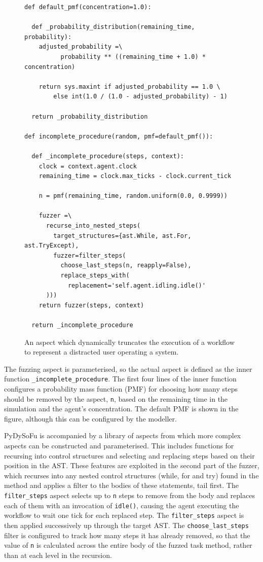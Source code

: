 \documentclass{llncs}
\begin{document}
\begin{figure}[t]
  \centering
\begin{lstlisting}
def default_pmf(concentration=1.0):

  def _probability_distribution(remaining_time, probability):
    adjusted_probability =\
          probability ** ((remaining_time + 1.0) * concentration)

    return sys.maxint if adjusted_probability == 1.0 \
        else int(1.0 / (1.0 - adjusted_probability) - 1)

  return _probability_distribution

def incomplete_procedure(random, pmf=default_pmf()):

  def _incomplete_procedure(steps, context):
    clock = context.agent.clock
    remaining_time = clock.max_ticks - clock.current_tick

    n = pmf(remaining_time, random.uniform(0.0, 0.9999))

    fuzzer =\
      recurse_into_nested_steps(
        target_structures={ast.While, ast.For, ast.TryExcept),
        fuzzer=filter_steps(
          choose_last_steps(n, reapply=False),
          replace_steps_with(
            replacement='self.agent.idling.idle()'
      )))
    return fuzzer(steps, context)

  return _incomplete_procedure
\end{lstlisting}
  \caption{An aspect which dynamically truncates the execution of a workflow to represent a distracted user operating a
    system.}
  \label{fig:distraction-fuzzer}
\end{figure}
The fuzzing aspect is parameterised, so the actual aspect is defined as the inner function
\lstinline!_incomplete_procedure!.  The first four lines of the inner function configures a probability mass function
(PMF) for choosing how many steps should be removed by the aspect, \lstinline!n!, based on the remaining time in the
simulation and the agent's concentration. The default PMF is shown in the figure, although this can be configured by the
modeller.

PyDySoFu is accompanied by a library of aspects from which more complex aspects can be constructed and parameterised.
This includes functions for recursing into control structures and selecting and replacing steps based on their position
in the AST.  These features are exploited in the second part of the fuzzer, which recurses into any nested control
structures (while, for and try) found in the method and applies a filter to the bodies of these statements, tail first.
The \lstinline!filter_steps! aspect selects up to \lstinline!n! steps to remove from the body and replaces each of them
with an invocation of \lstinline!idle()!, causing the agent executing the workflow to wait one tick for each replaced
step.  The \lstinline!filter_steps! aspect is then applied successively up through the target AST.  The
\lstinline!choose_last_steps! filter is configured to track how many steps it has already removed, so that the value of
\lstinline!n! is calculated across the entire body of the fuzzed task method, rather than at each level in the
recursion.
\end{document}

